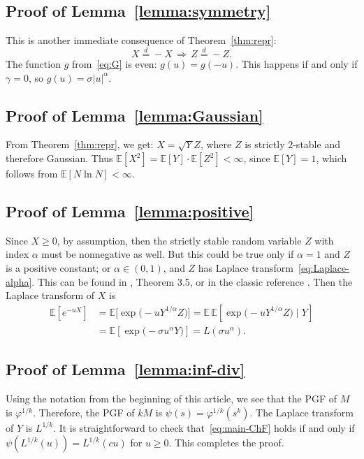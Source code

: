 \documentclass[12pt]{amsart}
\theoremstyle{remark}
\theoremstyle{definition}
\begin{document}
\subsection{Proof of Lemma~\ref{lemma:symmetry}} This is another immediate consequence of Theorem~\ref{thm:repr}: 
$$
X \stackrel{d}{=} -X\, \Rightarrow\, Z \stackrel{d}{=} -Z.
$$
The function $g$ from~\eqref{eq:G} is even: $g(u) = g(-u)$. This happens if and only if $\gamma = 0$, so $g(u) = \sigma |u|^{\alpha}$. 

\subsection{Proof of Lemma~\ref{lemma:Gaussian}} From Theorem~\ref{thm:repr}, we get: $X = \sqrt{Y}Z$, where $Z$ is strictly $2$-stable and therefore Gaussian. Thus 
$\mathbb E[X^2] = \mathbb E[Y]\cdot\mathbb E[Z^2] < \infty$, since 
$\mathbb E[Y] = 1$, which follows from $\mathbb E[N\ln N] < \infty$. 

\subsection{Proof of Lemma~\ref{lemma:positive}} Since $X \ge 0$, by assumption, then the strictly stable random variable $Z$ with index $\alpha$ must be nonnegative as well. But this could be true only if $\alpha = 1$ and $Z$ is a positive constant; or $\alpha \in (0, 1)$, and $Z$ has Laplace transform~\eqref{eq:Laplace-alpha}. This can be found in \cite[Chapter V]{SteutelBook}, Theorem 3.5, or in the classic reference \cite{STbook}. Then the Laplace transform of $X$ is 
\begin{align*}
\mathbb E[e^{-uX}] &= \mathbb E\bigl[\exp\bigl(-uY^{1/\alpha}Z\bigr)\bigr] = \mathbb E\,\mathbb E\left[\exp\bigl(-uY^{1/\alpha}Z\bigr)\mid Y\right] \\ & = \mathbb E\left[\exp\bigl(-\sigma u^{\alpha}Y\bigr)\right] = L(\sigma u^{\alpha}).
\end{align*}

\subsection{Proof of Lemma~\ref{lemma:inf-div}} Using the notation from the beginning of this article, we see that the PGF of $M$ is $\varphi^{1/k}$. Therefore, the PGF of $kM$ is $\psi(s) = \varphi^{1/k}(s^k)$. The Laplace transform of $Y$ is $L^{1/k}$. It is straightforward to check that~\eqref{eq:main-ChF} holds if and only if $\psi(L^{1/k}(u)) = L^{1/k}(cu)$ for $u \ge 0$. This completes the proof. 
\end{document}
